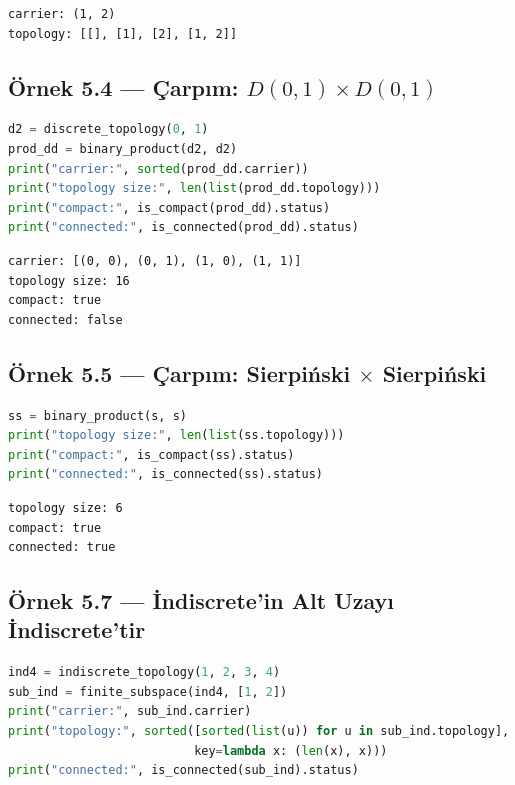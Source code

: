\begin{verbatim}
carrier: (1, 2)
topology: [[], [1], [2], [1, 2]]
\end{verbatim}

\subsection*{Örnek 5.4 — Çarpım: $D(0,1) \times D(0,1)$}

\begin{lstlisting}[language=Python]
d2 = discrete_topology(0, 1)
prod_dd = binary_product(d2, d2)
print("carrier:", sorted(prod_dd.carrier))
print("topology size:", len(list(prod_dd.topology)))
print("compact:", is_compact(prod_dd).status)
print("connected:", is_connected(prod_dd).status)
\end{lstlisting}

\begin{verbatim}
carrier: [(0, 0), (0, 1), (1, 0), (1, 1)]
topology size: 16
compact: true
connected: false
\end{verbatim}

\subsection*{Örnek 5.5 — Çarpım: Sierpiński $\times$ Sierpiński}

\begin{lstlisting}[language=Python]
ss = binary_product(s, s)
print("topology size:", len(list(ss.topology)))
print("compact:", is_compact(ss).status)
print("connected:", is_connected(ss).status)
\end{lstlisting}

\begin{verbatim}
topology size: 6
compact: true
connected: true
\end{verbatim}

\subsection*{Örnek 5.7 — İndiscrete'in Alt Uzayı İndiscrete'tir}

\begin{lstlisting}[language=Python]
ind4 = indiscrete_topology(1, 2, 3, 4)
sub_ind = finite_subspace(ind4, [1, 2])
print("carrier:", sub_ind.carrier)
print("topology:", sorted([sorted(list(u)) for u in sub_ind.topology],
                          key=lambda x: (len(x), x)))
print("connected:", is_connected(sub_ind).status)
\end{lstlisting}


